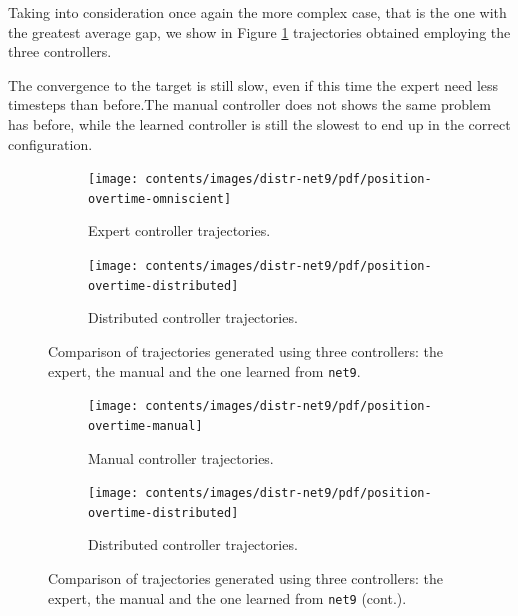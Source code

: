Taking into consideration once again the more complex case, that is the one 
with the greatest average gap, we show in Figure \ref{fig:net9traj} trajectories 
obtained employing the three controllers. 

The convergence to the target is still slow, even if this time the expert need 
less timesteps than before.The manual controller does not shows the same 
problem has before, while the learned controller is still the slowest to end up in 
the correct configuration.
\begin{figure}[!htb]
	\begin{center}
		\begin{subfigure}[h]{0.49\textwidth}
			\centering
			\texttt{[image: contents/images/distr-net9/pdf/position-overtime-omniscient]}%
			\caption{Expert controller trajectories.}
		\end{subfigure}
		\hfill
		\begin{subfigure}[h]{0.49\textwidth}
			\centering
			\texttt{[image: contents/images/distr-net9/pdf/position-overtime-distributed]}
			\caption{Distributed controller trajectories.}
		\end{subfigure}
	\end{center}
	\caption[Evaluation of the trajectories learned by 
	\texttt{net9}.]{Comparison of trajectories generated using three controllers: the 
	expert, the manual and the one learned from \texttt{net9}.}
\end{figure}
\medskip
\begin{figure}[!htb]\ContinuedFloat
	\centering
	\begin{subfigure}[h]{0.49\textwidth}
		\centering
		\texttt{[image: contents/images/distr-net9/pdf/position-overtime-manual]}%
		\caption{Manual controller trajectories.}
	\end{subfigure}
	\hfill
	\begin{subfigure}[h]{0.49\textwidth}
		\centering
		\texttt{[image: contents/images/distr-net9/pdf/position-overtime-distributed]}
		\caption{Distributed controller trajectories.}
	\end{subfigure}
	\caption[]{Comparison of trajectories generated using three controllers: the 
	expert, the manual and the one learned from \texttt{net9} (cont.).}
	\label{fig:net9traj}
\end{figure}


